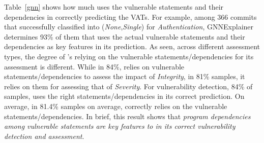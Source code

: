 



Table~\ref{gnn} shows how much {\tool} uses the vulnerable
statements and their dependencies in correctly predicting the
VATs. For example, among 366 commits that {\tool} successfully
classified into ({\em None},{\em Single}) for {\em Authentication},
GNNExplainer determines 93\% of them that {\tool}
uses the actual vulnerable statements and their dependencies as key
features in its prediction.
As seen, across different assessment types, the degree of {\tool}'s
relying on the vulnerable statements/dependencies for its assessment
is different.  While in 84\%, {\tool} relies on vulnerable
statements/dependencies to assess the impact of {\em Integrity}, in 81\% samples, it relies on them for assessing that of {\em Severity}.
For vulnerability detection, 84\% of samples, {\tool} uses
the right statements/dependencies in its correct prediction.
%
On average, in 81.4\% samples on average, {\tool} correctly
relies on the vulnerable statements/dependencies.
In brief, this result shows that {\em program dependencies among
vulnerable statements are key features to {\tool} in its correct
vulnerability detection and assessment}.



